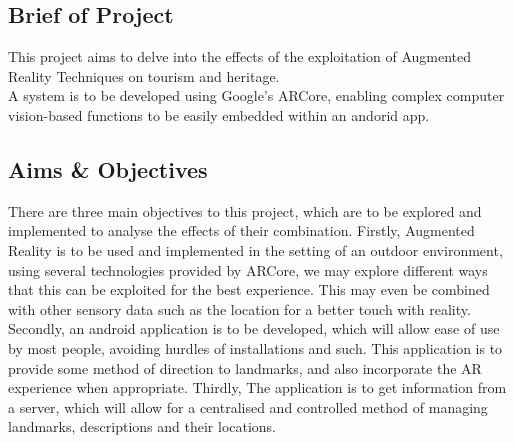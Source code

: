 \subsection{Brief of Project}
This project aims to delve into the effects of the exploitation of Augmented Reality Techniques on tourism and heritage.\\
A system is to be developed using Google's ARCore, enabling complex computer vision-based functions to be easily embedded within an andorid app. 
\subsection{Aims \& Objectives}
There are three main objectives to this project, which are to be explored and implemented to analyse the effects of their combination. 
Firstly,  Augmented Reality is to be used and implemented in the setting of an outdoor environment, using several technologies provided by ARCore,
we may explore different ways that this can be exploited for the best experience. This may even be combined with other sensory data such 
as the location for a better touch with reality. Secondly, an android application is to be developed, which will allow ease of use by most people, avoiding hurdles of 
installations and such. This application is to provide some method of direction to landmarks, and also incorporate the AR experience when 
appropriate. Thirdly, The application is to get information from a server, which will allow for a centralised and controlled method of managing 
landmarks, descriptions and their locations.   

